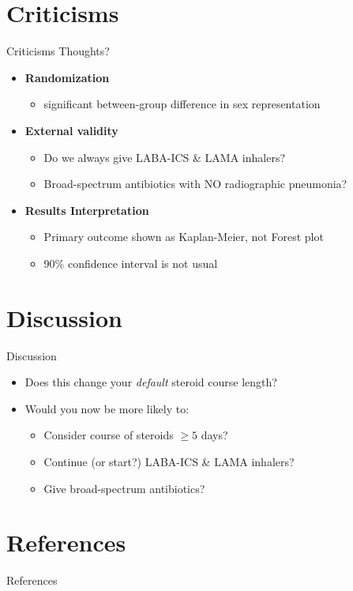 \documentclass{beamer}
\newcommand{\triple}{LABA-ICS \& LAMA }
\begin{document}
\section{Criticisms}
	\begin{frame}{Criticisms}
		Thoughts?
		\pause
		\begin{itemize}
			\item \textbf{Randomization}
			\begin{itemize}
				\item significant between-group difference in sex representation
			\end{itemize}
			\item \textbf{External validity}
			\begin{itemize}
				\item Do we always give \triple inhalers?
				\item Broad-spectrum antibiotics with NO radiographic pneumonia?
			\end{itemize}
			\item \textbf{Results Interpretation}
			\begin{itemize}
				\item Primary outcome shown as Kaplan-Meier, not Forest plot
				\item 90\% confidence interval is not usual
			\end{itemize}
		\end{itemize}
	\end{frame}
\section{Discussion}
	\begin{frame}{Discussion}
		\begin{itemize}
			\item Does this change your \textit{default} steroid course length?
			\item Would you now be more likely to:
				\begin{itemize}
					\item Consider course of steroids $\geq 5$ days?
					\item Continue (or start?) \triple inhalers?
					\item Give broad-spectrum antibiotics?
				\end{itemize} 
		\end{itemize}
	\end{frame}
\section*{References}
	\begin{frame}[allowframebreaks]{References}
		\printbibliography
	\end{frame}
\end{document}
